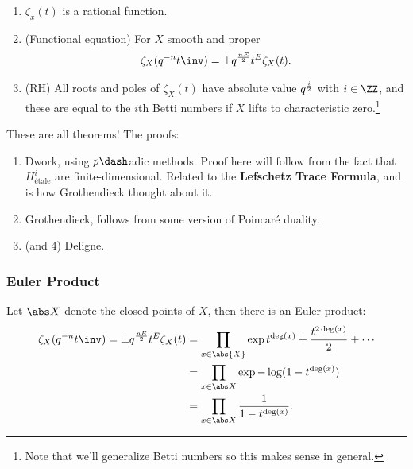 \begin{theorem}

\envlist

\begin{enumerate}
\def\labelenumi{\arabic{enumi}.}
\item
  \(\zeta_x(t)\) is a rational function.
\item
  (Functional equation) For \(X\) smooth and proper
  \begin{align*}  
  \zeta_X(q^{-n} t\inv) = \pm q^{nE \over 2} t^E \zeta_X(t)
  .\end{align*}
\item
  (RH) All roots and poles of \(\zeta_X(t)\) have absolute value
  \(q^{i\over 2}\) with \(i\in \ZZ\), and these are equal to the \(i\)th
  Betti numbers if \(X\) lifts to characteristic zero.\footnote{Note
    that we'll generalize Betti numbers so this makes sense in general.}
\end{enumerate}

\end{theorem}

\begin{remark}

These are all theorems! The proofs:

\begin{enumerate}
\def\labelenumi{\arabic{enumi}.}
\item
  Dwork, using \(p\dash\)adic methods. Proof here will follow from the
  fact that \(H^i_{\text{étale} }\) are finite-dimensional. Related to
  the \textbf{Lefschetz Trace Formula}, and is how Grothendieck thought
  about it.
\item
  Grothendieck, follows from some version of Poincaré duality.
\item
  (and 4) Deligne.
\end{enumerate}

\end{remark}

\hypertarget{euler-product}{%
\subsubsection{Euler Product}\label{euler-product}}

Let \(\abs X\) denote the closed points of \(X\), then there is an Euler
product:
\begin{align*}  
\zeta_X(q^{-n} t\inv) = \pm q^{nE \over 2} t^E \zeta_X(t)
&= \prod_{x\in \abs{X}} \exp{t^{\deg (x)} + {t^{2\deg (x)} \over 2} + \cdots} \\
&= \prod_{x\in \abs X} \exp{-\log(1-t^{\deg(x)})} \\
&= \prod_{x\in \abs X} {1 \over 1 - t^{\deg(x)}}
.\end{align*}

